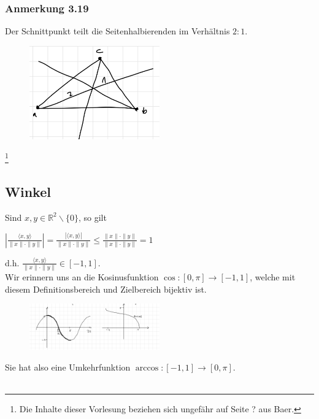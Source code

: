 \documentclass{article}
\begin{document}
\subsubsection*{Anmerkung 3.19}
Der Schnittpunkt teilt die Seitenhalbierenden im Verhältnis $2:1$. \\
\begin{figure}[h]
    \centering
    \includegraphics[width=0.5\textwidth]{Images/3.19.jpeg}

\end{figure}

\newpage
\date{Mittwoch, 06.12.23} \footnote[1]{Die Inhalte dieser Vorlesung beziehen sich ungefähr auf Seite ? aus Baer.}
\subsection{Winkel}
Sind $x,y \in \mathbb{R}^2\backslash\{0\}$, so gilt \\
\begin{center}
    $\left| \frac{\langle x,y \rangle}{\|x\| \cdot \|y\|} \right| = \frac{|\langle x,y \rangle|}{\|x\| \cdot \|y\|} \leq \frac{\|x\| \cdot \|y\|}{\|x\| \cdot \|y\|} = 1$
\end{center}
d.h. $\frac{\langle x,y \rangle}{\|x\| \cdot \|y\|} \in [-1,1]$. \\
Wir erinnern uns an die Kosinusfunktion $\cos: [0,\pi] \rightarrow [-1,1]$, welche mit diesem Definitionsbereich und Zielbereich bijektiv ist. \\
\begin{figure}[h]
    \centering
    \includegraphics[width=0.5\textwidth]{Images/3.3.jpeg}

\end{figure}
Sie hat also eine Umkehrfunktion $\arccos: [-1,1] \rightarrow [0,\pi]$. \\
\\
\end{document}
